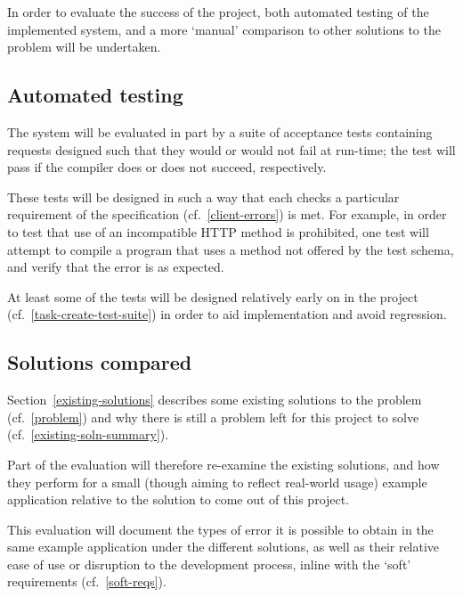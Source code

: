 \begin{task}
\end{task}

In order to evaluate the success of the project, both automated testing of the implemented system, and a more `manual' comparison to other solutions to the problem will be undertaken.

\subsection{Automated testing}\label{eval-auto-test}
The system will be evaluated in part by a suite of acceptance tests containing requests designed such that they would or would not fail at run-time; the test will pass if the compiler does or does not succeed, respectively.

These tests will be designed in such a way that each checks a particular requirement of the specification (cf.~\ref{client-errors}) is met. For example,  in order to test that use of an incompatible HTTP method is prohibited, one test will attempt to compile a program that uses a method not offered by the test schema, and verify that the error is as expected.

At least some of the tests will be designed relatively early on in the project (cf.~\ref{task-create-test-suite}) in order to aid implementation and avoid regression.

\subsection{Solutions compared}\label{eval-soln-comparison}
Section~\ref{existing-solutions} describes some existing solutions to the problem (cf.~\ref{problem}) and why there is still a problem left for this project to solve (cf.~\ref{existing-soln-summary}).

Part of the evaluation will therefore re-examine the existing solutions, and how they perform for a small (though aiming to reflect real-world usage) example application relative to the solution to come out of this project.

This evaluation will document the types of error it is possible to obtain in the same example application under the different solutions, as well as their relative ease of use or disruption to the development process, inline with the `soft' requirements (cf.~\ref{soft-reqs}).

